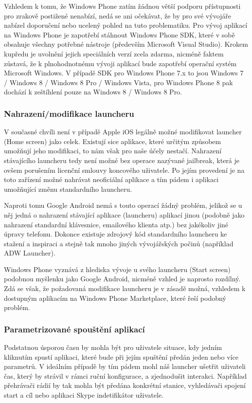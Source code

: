 \documentclass[thesis=M,czech]{FITthesis}[2012/06/26]
\begin{document}
Vzhledem k tomu, že Windows Phone zatím žádnou větší podporu přístupnosti pro zrakově postižené nenabízí, nedá se ani očekávat, že by pro své vývojáře nabízel doporučení nebo ucelený pohled na tuto problematiku. Pro vývoj aplikací na Windows Phone je zapotřebí stáhnout Windows Phone SDK\cite{win_sdk}, které v sobě obsahuje všechny potřebné nástroje\cite{win8_sdk} (především Microsoft Visual Studio). Krokem kupředu je uvolnění jejich speciálních verzí zcela zdarma, nicméně faktem zůstavá, že k plnohodnotnému vývoji aplikací bude zapotřebí operační systém Microsoft Windows. V případě SDK pro Windows Phone 7.x to jsou Windows 7 / Windows 8 / Windows 8 Pro / Windows Vista, pro Windows Phone 8 pak dochází k zeštíhlení pouze na Windows 8 / Windows 8 Pro.

\subsubsection*{Nahrazení/modifikace launcheru}
V současné chvíli není v případě Apple iOS legálně možné modifikovat launcher (Home screen) jako celek. Existují sice aplikace, které určitým způsobem umožňují jeho modifikaci\cite{iphone_shortcuts}, to nám však pro naše účely nestačí. Nahrazení stávajícího launcheru tedy není možné bez operace nazývané jailbreak\cite{ios_jailbreak}, která je ovšem porušením licenční smlouvy koncového uživatele\cite{apple_about_jailbreak}. Po jejím provedení je na toto zařízení možné nahrávat neoficiální aplikace a tím pádem i aplikaci umožňující změnu standardního launcheru\cite{iphone_launcher}.

Naproti tomu Google Android nemá s touto operací žádný problém, jelikož se u něj jedná o nahrazení stávající aplikace (launcheru) aplikací jinou (podobně jako nahrazení standardní klávesnice, emailového klienta atp.) bez jakékoliv jiné úpravy telefonu. Dokonce existuje zdrojový kód standardního launcheru ke stažení a inspiraci\cite{android_launcher} a stejně tak mnoho jiných vývojářských počinů (například ADW Launcher\cite{android_adw_launcher}).

Windows Phone vyznává z hlediska vývoje u svého launcheru (Start screen) podobnou myšlenku jako Google Android, nicméně vzhled je naprosto rozdílný. Zdá se však, že požadovaná modifikace launcheru je v zásadě možná, vzhledem k dostupným aplikacím na Windows Phone Marketplace, které řeší podobný problém\cite{win_launcher}\cite{win_launcher2}.

\subsubsection*{Parametrizované spouštění aplikací}
Podstatnou úsporou času by mohla být pro uživatele situace, kdy jedním kliknutím spustí aplikaci, které bude při jejím spuštění předán jeden nebo více parametrů. V ideálním případě by tím pádem mohl náš launcher ušetřit uživateli čas, který by strávil v rámci ruční konfigurace, a zjednodušit interakci. Například přehrávači rádií by tak mohla být předána konkrétní stanice, vyhledávači spojení start a cíl nebo aplikaci Skype indetifikátor uživatele.
\end{document}
